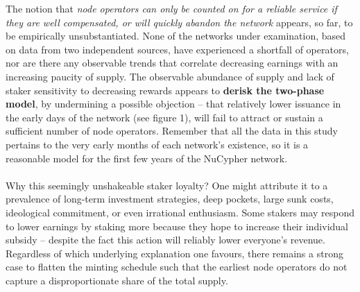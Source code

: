 \documentclass[longbibliography,nofootinbib]{revtex4-1}
\begin{document}
The notion that \textit{node operators can only be counted on for a reliable service if they are well compensated, or will quickly abandon the network} appears, so far, to be empirically unsubstantiated. None of the networks under examination, based on data from two independent sources, have experienced a shortfall of operators, nor are there any observable trends that correlate decreasing earnings with an increasing paucity of supply. The observable abundance of supply and lack of staker sensitivity to decreasing rewards appears to \textbf{derisk the two-phase model}, by undermining a possible objection – that relatively lower issuance in the early days of the network (see figure 1), will fail to attract or sustain a sufficient number of node operators. Remember that all the data in this study pertains to the very early months of each network's existence, so it is a reasonable model for the first few years of the NuCypher network.
\\\\ 
Why this seemingly unshakeable staker loyalty? One might attribute it to a prevalence of long-term investment strategies, deep pockets, large sunk costs, ideological commitment, or even irrational enthusiasm. Some stakers may respond to lower earnings by staking more because they hope to increase their individual subsidy – despite the fact this action will reliably lower everyone's revenue. Regardless of which underlying explanation one favours, there remains a strong case to flatten the minting schedule such that the earliest node operators do not capture a disproportionate share of the total supply.
\end{document}
